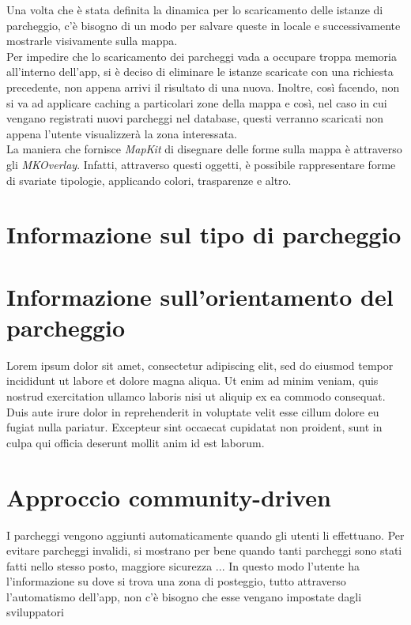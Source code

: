 Una volta che è stata definita la dinamica per lo scaricamento delle istanze di 
parcheggio, c'è bisogno di un modo per salvare queste in locale e successivamente 
mostrarle visivamente sulla mappa.\\
Per impedire che lo scaricamento dei parcheggi vada a occupare troppa memoria 
all'interno dell'app, si è deciso di eliminare le istanze scaricate con una 
richiesta precedente, non appena arrivi il risultato di una nuova. Inoltre, 
così facendo, non si va ad applicare caching a particolari zone della mappa
e così, nel caso in cui vengano registrati nuovi parcheggi nel database, questi 
verranno scaricati non appena l'utente visualizzerà la zona interessata.\\
La maniera che fornisce \emph{MapKit} di disegnare delle forme sulla mappa è 
attraverso gli \emph{MKOverlay}. Infatti, attraverso questi oggetti, è possibile
rappresentare forme di svariate tipologie, applicando colori, trasparenze e altro.



\section{Informazione sul tipo di parcheggio} 


\section{Informazione sull'orientamento del parcheggio} Lorem ipsum dolor sit amet, consectetur adipiscing elit, sed do eiusmod tempor incididunt ut labore et dolore magna aliqua. Ut enim ad minim veniam, quis nostrud exercitation ullamco laboris nisi ut aliquip ex ea commodo consequat. Duis aute irure dolor in reprehenderit in voluptate velit esse cillum dolore eu fugiat nulla pariatur. Excepteur sint occaecat cupidatat non proident, sunt in culpa qui officia deserunt mollit anim id est laborum.

\section{Approccio community-driven}

I parcheggi vengono aggiunti automaticamente quando gli utenti li effettuano. 
Per evitare parcheggi invalidi, si mostrano per bene quando tanti parcheggi sono stati
fatti nello stesso posto, maggiore sicurezza ...
In questo modo l'utente ha l'informazione su dove si trova una zona di posteggio, tutto
attraverso l'automatismo dell'app, non c'è bisogno che esse vengano impostate dagli sviluppatori

